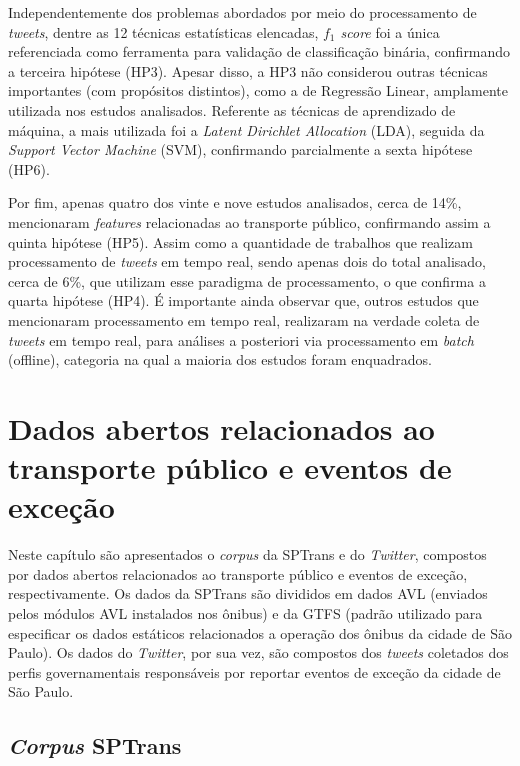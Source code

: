 \documentclass[
	12pt,				%
	oneside,			%
	a4paper,			%
	english,			%
	brazil				%
	]{abntex2ppgsi}
\begin{document}
{{{Independentemente dos problemas abordados por meio do processamento de \textit{tweets}, dentre as 12 técnicas estatísticas elencadas, \textit{${f_1}$ score} foi a única referenciada como ferramenta para validação de classificação binária, confirmando a terceira hipótese (HP3). Apesar disso, a HP3 não considerou outras técnicas importantes (com propósitos distintos), como a de Regressão Linear, amplamente utilizada nos estudos analisados. Referente as técnicas de aprendizado de máquina, a mais utilizada foi a \textit{Latent Dirichlet Allocation} (LDA), seguida da \textit{Support Vector Machine} (SVM), confirmando parcialmente a sexta hipótese (HP6).

Por fim, apenas quatro dos vinte e nove estudos analisados, cerca de 14\%, mencionaram \textit{features} relacionadas ao transporte público, confirmando assim a quinta hipótese (HP5). Assim como a quantidade de trabalhos que realizam processamento de \textit{tweets} em tempo real, sendo apenas dois do total analisado, cerca de 6\%, que utilizam esse paradigma de processamento, o que confirma a quarta hipótese (HP4). É importante ainda observar que, outros estudos que mencionaram processamento em tempo real, realizaram na verdade coleta de \textit{tweets} em tempo real, para análises a posteriori via processamento em \textit{batch} (offline), categoria na qual a maioria dos estudos foram enquadrados.

\chapter{Dados abertos relacionados ao transporte público e eventos de exceção}
\label{dataSet}

Neste capítulo são apresentados o \textit{corpus} da SPTrans e do \textit{Twitter}, compostos por dados abertos relacionados ao transporte público e eventos de exceção, respectivamente. Os dados da SPTrans são divididos em dados AVL (enviados pelos módulos AVL instalados nos ônibus) e da GTFS (padrão utilizado para especificar os dados estáticos relacionados a operação dos ônibus da cidade de São Paulo). Os dados do \textit{Twitter}, por sua vez, são compostos dos \textit{tweets} coletados dos perfis governamentais responsáveis por reportar eventos de exceção da cidade de São Paulo.

\section{\textit{Corpus} SPTrans}
\label{CorpusSPTrans}

}}}
\end{document}
